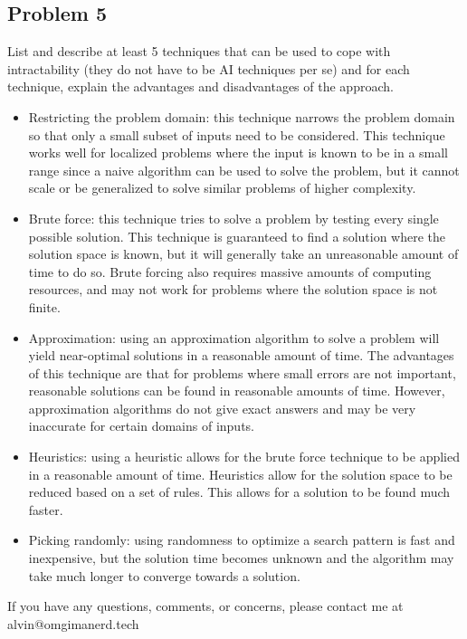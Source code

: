 \documentclass{math}
\begin{document}
\subsection*{Problem 5}
List and describe at least 5 techniques that can be used to cope with
intractability (they do not have to be AI techniques per se) and for each
technique, explain the advantages and disadvantages of the approach.
\begin{itemize}
  \item Restricting the problem domain: this technique narrows the problem
  domain so that only a small subset of inputs need to be considered. This
  technique works well for localized problems where the input is known to be
  in a small range since a naive algorithm can be used to solve the problem,
  but it cannot scale or be generalized to solve similar problems of higher
  complexity.
  \item Brute force: this technique tries to solve a problem by testing every
  single possible solution. This technique is guaranteed to find a solution
  where the solution space is known, but it will generally take an unreasonable
  amount of time to do so. Brute forcing also requires massive amounts of
  computing resources, and may not work for problems where the solution space
  is not finite.
  \item Approximation: using an approximation algorithm to solve a problem will
  yield near-optimal solutions in a reasonable amount of time. The advantages
  of this technique are that for problems where small errors are not important,
  reasonable solutions can be found in reasonable amounts of time. However,
  approximation algorithms do not give exact answers and may be very inaccurate
  for certain domains of inputs.
  \item Heuristics: using a heuristic allows for the brute force technique to be
  applied in a reasonable amount of time. Heuristics allow for the solution
  space to be reduced based on a set of rules. This allows for a solution to be
  found much faster.
  \item Picking randomly: using randomness to optimize a search pattern is fast
  and inexpensive, but the solution time becomes unknown and the algorithm
  may take much longer to converge towards a solution.
\end{itemize}

\begin{center}
  If you have any questions, comments, or concerns, please contact me at
  alvin@omgimanerd.tech
\end{center}
\end{document}
